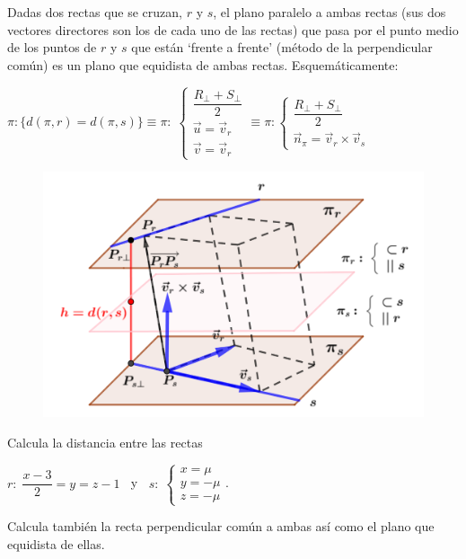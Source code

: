 Dadas dos rectas que se cruzan, $r$ y $s$, el plano paralelo a ambas rectas (sus dos vectores directores son los de cada uno de las rectas) que pasa por el punto medio de los puntos de $r$ y $s$ que están `frente a frente' (método de la perpendicular común) es un plano que equidista de ambas rectas. Esquemáticamente:

\noindent $\pi: \{d(\pi,r)=d(\pi,s)\} \equiv \pi:\; \begin{cases} \dfrac{R_\bot + S_\bot}{2} \\ \vec u=\vec v_r \\ \vec v=\vec v_r  \end{cases}\equiv \pi:\begin{cases} \dfrac{R_\bot + S_\bot}{2} \\ \vec n_{\pi}=\vec v_r \times \vec v_s \end{cases}$

 \begin{figure}[H]
		\centering
		\includegraphics[width=1\textwidth]{imagenes/imagenes11/T11IM23.png}
	\end{figure}


\begin{ejem}
	Calcula la distancia entre las rectas 
	
	$r:\;\dfrac{x-3}{2}=y=z-1\;\;$ y $\;\;s:\; \begin{cases} x=\mu\\y=-\mu\\z=-\mu\end{cases}$. 
	
	Calcula también la recta perpendicular común a ambas así como el plano que equidista de ellas.
\end{ejem}


